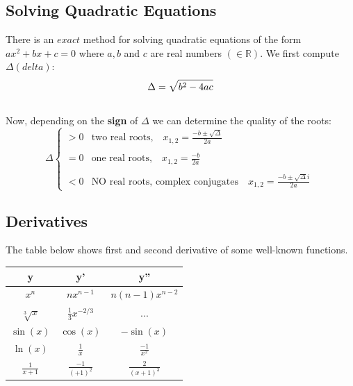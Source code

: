 \documentclass[a4paper, 11pt]{article}
\begin{document}
\subsection{Solving Quadratic Equations}
There is an $exact$ method for solving quadratic equations of the form $ax^2 + bx + c = 0$ where $a, b$ and
$c$ are real numbers $(\in \mathbb{R})$. We first compute $\Delta (delta):$
\begin{equation}\\
\Delta = \sqrt{b^2 - 4ac}
\end{equation}\\
Now, depending on the \textbf{sign} of $\Delta$ we can determine the quality of the roots:
\begin{equation*}          %
\Delta    
\begin{cases}
>0 & \textrm{two real roots,} \quad x_{1,2} = \frac{-b\pm \sqrt{\Delta}}{2a}\ \\\\     %
=0 & \textrm{one real roots,} \quad x_{1,2} = \frac{-b}{2a}\  \\\\
<0 & \textrm{NO real roots, complex conjugates} \quad x_{1,2} = \frac{-b\pm \sqrt{\Delta}i}{2a}\  
\end{cases}
\end{equation*}           %



\subsection{Derivatives}
The table below shows first and second derivative of some well-known functions.
\begin{table}[h]
\centering  
\begin{tabular}{|c|c|c|}            
\hline
y & y' & y''\\
\hline
$x^n$ & $nx^{n-1}$ &$ n(n-1)x^{n-2}$\\
$\sqrt[3]{x}$ & $\frac{1}{3}x^{-2/3}$ & ... \\
$\sin(x)$ &  $\cos(x)$ & $-\sin(x)$ \\
$\ln(x)$ &$ \frac{1}{x}$ &$ \frac{-1}{x^2}$\\
$\frac{1}{x+1}$&  $\frac{-1}{(+1)^2}$ &  $\frac{2}{(x+1)^3}$\\
\hline
\end{tabular}
\end{table}
\end{document}
